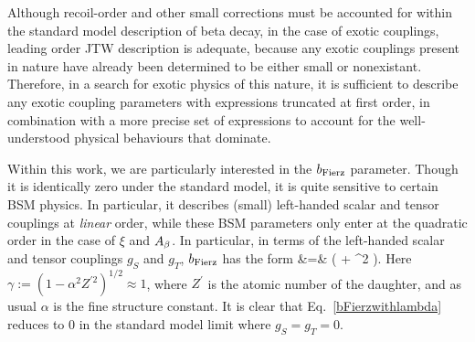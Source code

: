 Although recoil-order and other small corrections must be accounted for within the standard model description of beta decay, in the case of exotic couplings, leading order \ac{JTW} description is adequate, because any exotic couplings present in nature have already been determined to be either small or nonexistant.  Therefore, in a search for exotic physics of this nature, it is sufficient to describe any exotic coupling parameters with expressions truncated at first order, in combination with a more precise set of expressions to account for the well-understood physical behaviours that dominate.  

Within this work, we are particularly interested in the $b_{\mathrm{Fierz}}$ parameter.  Though it is identically zero under the standard model, it is quite sensitive to certain \ac{BSM} physics.  In particular, it describes (small) left-handed scalar and tensor couplings at \emph{linear} order, while these \ac{BSM} parameters only enter at the quadratic order in the case of $\xi$ and $A_{\beta}$.  In particular, in terms of the left-handed scalar and tensor couplings $g_S$ and $g_T$, $b_{\mathrm{Fierz}}$ has the form 
\bea
\bFierz &=&  \left(  + \rho^2  \right). 
\label{bFierzwithlambda}
\eea
Here $\gamma := \left( 1-\alpha^2 Z^{\prime 2} \right)^{1/2} \approx 1$, where $Z^\prime$ is the atomic number of the daughter, and as usual $\alpha$ is the fine structure constant. It is clear that Eq.~\ref{bFierzwithlambda} reduces to 0 in the standard model limit where $g_S = g_T = 0$.



